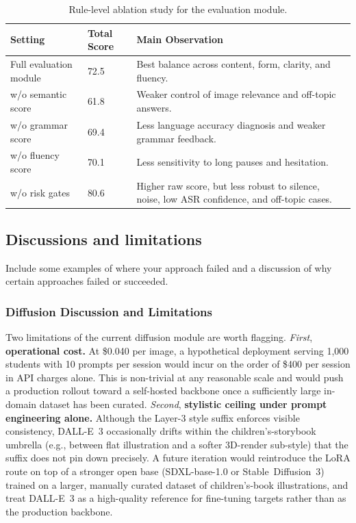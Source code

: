 \documentclass{article}
\begin{document}
\begin{table}[t]
\centering
\caption{Rule-level ablation study for the evaluation module.}
\label{tab:evaluation-ablation}
\scriptsize
\setlength{\tabcolsep}{3pt}
\begin{tabular}{p{}p{}p{}}
\toprule
Setting & Total Score & Main Observation \\
\midrule
Full evaluation module & 72.5 & Best balance across content, form, clarity, and fluency. \\
w/o semantic score & 61.8 & Weaker control of image relevance and off-topic answers. \\
w/o grammar score & 69.4 & Less language accuracy diagnosis and weaker grammar feedback. \\
w/o fluency score & 70.1 & Less sensitivity to long pauses and hesitation. \\
w/o risk gates & 80.6 & Higher raw score, but less robust to silence, noise, low ASR confidence, and off-topic cases. \\
\bottomrule
\end{tabular}
\end{table}
\subsection{Discussions and limitations}
Include some examples of where your approach failed and a discussion of why certain approaches failed or succeeded.

\subsubsection{Diffusion Discussion and Limitations}
\label{sec:diffusion-discussion}

Two limitations of the current diffusion module are worth flagging.
\textit{First}, \textbf{operational cost.} At \$0.040 per image, a
hypothetical deployment serving 1{,}000 students with 10 prompts per
session would incur on the order of \$400 per session in API charges
alone. This is non-trivial at any reasonable scale and would push a
production rollout toward a self-hosted backbone once a sufficiently
large in-domain dataset has been curated.
\textit{Second}, \textbf{stylistic ceiling under prompt engineering
alone.} Although the Layer-3 style suffix enforces visible consistency,
DALL-E~3 occasionally drifts within the children's-storybook umbrella
(e.g., between flat illustration and a softer 3D-render sub-style)
that the suffix does not pin down precisely. A future iteration would
reintroduce the LoRA route on top of a stronger open base
(SDXL-base-1.0 or Stable~Diffusion~3) trained on a larger, manually
curated dataset of children's-book illustrations, and treat DALL-E~3
as a high-quality reference for fine-tuning targets rather than as the
production backbone.
\end{document}
